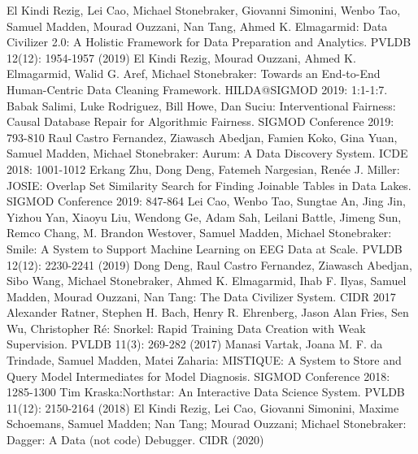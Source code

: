 \documentclass[11pt]{article}
\begin{document}

\begin{thebibliography}{10}
\begin{small}
El Kindi Rezig, Lei Cao, Michael Stonebraker, Giovanni Simonini, Wenbo Tao, Samuel Madden, Mourad Ouzzani, Nan Tang, Ahmed K. Elmagarmid: Data Civilizer 2.0: A Holistic Framework for Data Preparation and Analytics. PVLDB 12(12): 1954-1957 (2019)
El Kindi Rezig, Mourad Ouzzani, Ahmed K. Elmagarmid, Walid G. Aref, Michael Stonebraker:
Towards an End-to-End Human-Centric Data Cleaning Framework. HILDA@SIGMOD 2019: 1:1-1:7.
Babak Salimi, Luke Rodriguez, Bill Howe, Dan Suciu: Interventional Fairness: Causal Database Repair for Algorithmic Fairness. SIGMOD Conference 2019: 793-810
Raul Castro Fernandez, Ziawasch Abedjan, Famien Koko, Gina Yuan, Samuel Madden, Michael Stonebraker: Aurum: A Data Discovery System. ICDE 2018: 1001-1012
Erkang Zhu, Dong Deng, Fatemeh Nargesian, Renée J. Miller: JOSIE: Overlap Set Similarity Search for Finding Joinable Tables in Data Lakes. SIGMOD Conference 2019: 847-864
Lei Cao, Wenbo Tao, Sungtae An, Jing Jin, Yizhou Yan, Xiaoyu Liu, Wendong Ge, Adam Sah, Leilani Battle, Jimeng Sun, Remco Chang, M. Brandon Westover, Samuel Madden, Michael Stonebraker: Smile: A System to Support Machine Learning on EEG Data at Scale. PVLDB 12(12): 2230-2241 (2019)
Dong Deng, Raul Castro Fernandez, Ziawasch Abedjan, Sibo Wang, Michael Stonebraker, Ahmed K. Elmagarmid, Ihab F. Ilyas, Samuel Madden, Mourad Ouzzani, Nan Tang: The Data Civilizer System. CIDR 2017
Alexander Ratner, Stephen H. Bach, Henry R. Ehrenberg, Jason Alan Fries, Sen Wu, Christopher Ré:
Snorkel: Rapid Training Data Creation with Weak Supervision. PVLDB 11(3): 269-282 (2017)
Manasi Vartak, Joana M. F. da Trindade, Samuel Madden, Matei Zaharia: MISTIQUE: A System to Store and Query Model Intermediates for Model Diagnosis. SIGMOD Conference 2018: 1285-1300
Tim Kraska:Northstar: An Interactive Data Science System. PVLDB 11(12): 2150-2164 (2018)
El Kindi Rezig, Lei Cao, Giovanni Simonini, Maxime Schoemans, Samuel Madden; Nan Tang; Mourad Ouzzani; Michael Stonebraker: Dagger: A Data (not code) Debugger. CIDR (2020)
\end{small}
\end{thebibliography}
\end{document}
